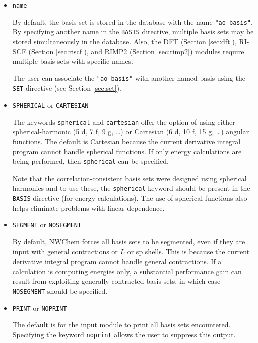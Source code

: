 \begin{itemize}
\item {\tt name}

By default, the basis set is stored in the database with the name
\verb+"ao basis"+.  By specifying another name in the \verb+BASIS+
directive, multiple basis sets may be stored simultaneously in the database.
Also, the DFT (Section \ref{sec:dft}), RI-SCF (Section \ref{sec:riscf}),
and RIMP2 (Section \ref{sec:rimp2}) modules require multiple basis
sets with specific names.

The user can associate the \verb+"ao basis"+ with another named basis
using the \verb+SET+ directive (see Section \ref{sec:set}).  

\item {{\tt SPHERICAL} or {\tt CARTESIAN}}

The keywords \verb+spherical+ and \verb+cartesian+ offer the option of
using either spherical-harmonic (5 d, 7 f, 9 g, \ldots) or Cartesian
(6 d, 10 f, 15 g, \ldots) angular functions.  The default is
Cartesian because the current  derivative integral program cannot
handle spherical functions.  If only energy calculations are being
performed, then {\tt spherical} can be specified.  

Note that the correlation-consistent basis sets were designed using
spherical harmonics and to use these, the \verb+spherical+ keyword
should be present in the \verb+BASIS+ directive (for energy
calculations).  The use of spherical functions also helps eliminate
problems with linear dependence.


\item {{\tt SEGMENT} or {\tt NOSEGMENT}}

By default, NWChem forces all basis sets to be segmented, 
even if they are input with general contractions or $L$ or sp
shells. This is because the current derivative integral program cannot
handle general contractions.  If a calculation is  
computing energies only, a substantial
performance gain can result from exploiting generally contracted basis
sets, in which case {\tt NOSEGMENT} should be specified.

\item {{\tt PRINT} or {\tt NOPRINT}}

The default is for the input module to print all basis sets encountered.
Specifying the keyword \verb+noprint+ allows the user to suppress this output.

\end{itemize}

